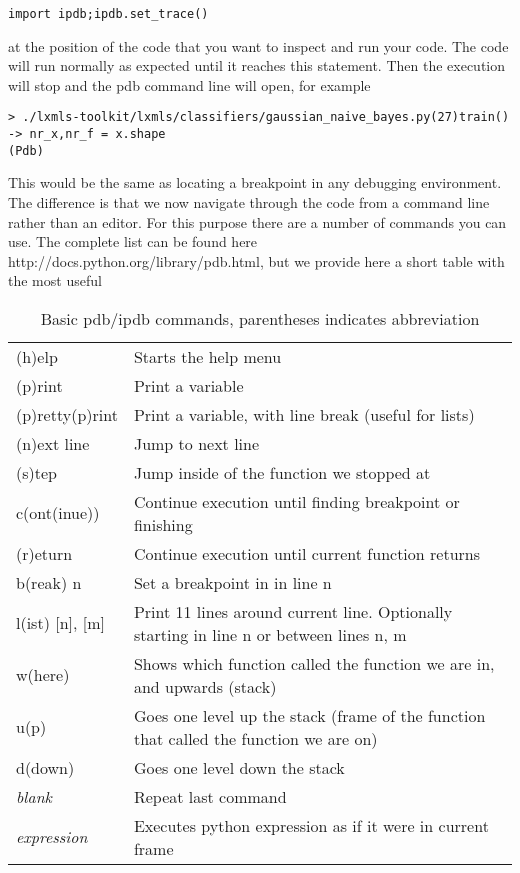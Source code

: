 \begin{verbatim}
import ipdb;ipdb.set_trace() 
\end{verbatim}
 
at the position of the code that you want to inspect and run your code. The code will run normally as expected until it reaches this statement. Then the execution will stop and the pdb command line will open, for example

\begin{verbatim}
> ./lxmls-toolkit/lxmls/classifiers/gaussian_naive_bayes.py(27)train()
-> nr_x,nr_f = x.shape
(Pdb) 
\end{verbatim} 

This would be the same as locating a breakpoint in any debugging environment. The difference is that we now navigate through the code from a command line rather than an editor. For this purpose there are a number of commands you can use. The complete list can be found here http://docs.python.org/library/pdb.html, but we provide here a short table with the most useful  

\begin{table}[!h]
\begin{center}
\begin{tabular}{|l|l|}
\hline
(h)elp           & Starts the help menu\\
(p)rint          & Print a variable\\
(p)retty(p)rint	 & Print a variable, with line break (useful for lists)\\
\hline
(n)ext line      & Jump to next line\\ 
(s)tep           & Jump inside of the function we stopped at\\
c(ont(inue))     & Continue execution until finding breakpoint or finishing\\
(r)eturn         & Continue execution until current function returns\\
b(reak) n        & Set a breakpoint in in line n\\
\hline
l(ist) [n], [m]  & Print 11 lines around current line. Optionally starting in line n or between lines n, m\\
w(here)          & Shows which function called the function we are in, and upwards (stack\footnotemark)\\
u(p)             & Goes one level up the stack (frame of the function that called the function we are on)\\
d(down)          & Goes one level down the stack\\
\hline
\textit{blank}          & Repeat last command\\ 
\textit{expression}     & Executes python expression as if it were in current frame\\
\hline
\end{tabular}
\end{center}
\caption{\label{tb::pdbbasiccommands}Basic pdb/ipdb commands, parentheses indicates abbreviation}
\end{table}

